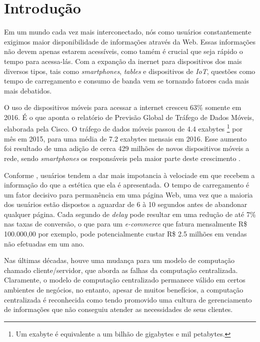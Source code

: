 \chapter[Introdução]{Introdução}


Em um mundo cada vez mais interconectado, nós como usuários constantemente exigimos maior disponibilidade de informações através da Web. Essas informações não devem apenas estarem acessíveis, como tamém é crucial que seja rápido o tempo para acessa-lás. Com a expanção da inernet para dispositivos dos mais diversos tipos, tais como \textit{smartphones}, \textit{tables} e dispositivos de \textit{IoT}, questões como tempo de carregamento e consumo de banda vem se tornando fatores cada mais mais debatidos.

O uso de dispositivos móveis para acessar a internet cresceu 63\% somente em 2016. É o que aponta o relatório de Previsão Global de Tráfego de Dados Móveis, elaborada pela Cisco. O tráfego de dados móveis passou de  4.4 exabytes \footnote{Um exabyte é equivalente a um bilhão de gigabytes e mil petabytes.} por mês em 2015, para uma média de 7.2 exabytes mensais em 2016. Esse aumento foi resultado de uma adição de cerca 429 milhões de novos dispositivos móveis a rede, sendo \textit{smartphones} os responsáveis pela maior parte deste crescimento \cite{cisco-network-report}.

Conforme , usuários tendem a dar mais impotancia à velociade em que recebem a informação do que a estética que ela é apresentada. O tempo de carregamento é um fator decisivo para permanência em uma página Web, uma vez que a maioria dos usuários estão dispostos a aguardar de 6 à 10 segundos antes de abandonar qualquer página. Cada segundo de \textit{delay} pode resultar em uma redução de até 7\% nas taxas de conversão, o que para um \textit{e-commerce} que fatura mensalmente R\$ 100.000,00 por exemplo, pode potencialmente custar R\$ 2.5 milhões em vendas não efetuadas em um ano.

Nas últimas décadas, houve uma mudança para um modelo de computação chamado cliente/servidor, que aborda as falhas da computação centralizada. Claramente, o modelo de computação centralizado permanece válido em certos ambientes de negócios, no entanto, apesar de muitos benefícios, a computação centralizada é reconhecida como tendo promovido uma cultura de gerenciamento de informações que não conseguiu atender as necessidades de seus clientes.

